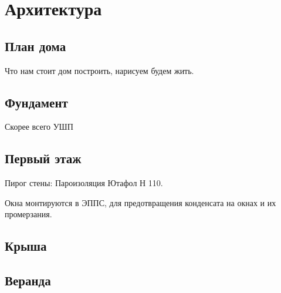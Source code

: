 \part{Архитектура}
\chapter{План дома}
Что нам стоит дом построить, нарисуем будем жить.


\chapter{Фундамент}

Скорее всего УШП

\chapter{Первый этаж}

Пирог стены:
Пароизоляция Ютафол Н 110.

Окна монтируются в ЭППС, для предотвращения конденсата на окнах и их промерзания.

\chapter{Крыша}

\chapter{Веранда}
